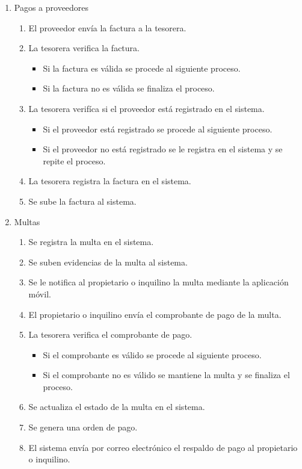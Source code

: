 \begin{itemize}
\begin{enumerate}
        \item Pagos a proveedores
        \begin{enumerate}
            \item El proveedor envía la factura a la tesorera.
            \item La tesorera verifica la factura.
            \begin{itemize}
                \item Si la factura es válida se procede al siguiente proceso.
                \item Si la factura no es válida se finaliza el proceso.
            \end{itemize}
            \item La tesorera verifíca si el proveedor está registrado en el sistema.
            \begin{itemize}
                \item Si el proveedor está registrado se procede al siguiente proceso.
                \item Si el proveedor no está registrado se le registra en el sistema y se repite el proceso.
            \end{itemize}
            \item La tesorera registra la factura en el sistema.
            \item Se sube la factura al sistema.
        \end{enumerate}

        \item Multas
        \begin{enumerate}
            \item Se registra la multa en el sistema.
            \item Se suben evidencias de la multa al sistema.
            \item Se le notifica al propietario o inquilino la multa mediante la aplicación móvil.
            \item El propietario o inquilino envía el comprobante de pago de la multa.
            \item La tesorera verifica el comprobante de pago.
            \begin{itemize}
                \item Si el comprobante es válido se procede al siguiente proceso.
                \item Si el comprobante no es válido se mantiene la multa y se finaliza el proceso.
            \end{itemize}
            \item Se actualiza el estado de la multa en el sistema.
            \item Se genera una orden de pago.
            \item El sistema envía por correo electrónico el respaldo de pago al propietario o inquilino.
        \end{enumerate}

    \end{enumerate}
\end{itemize}


